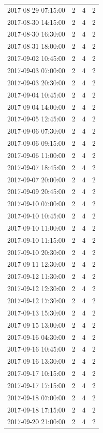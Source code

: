 \begin{tabular}{lrrr}
2017-08-29 07:15:00 & 2 & 4 & 2 \\
2017-08-30 14:15:00 & 2 & 4 & 2 \\
2017-08-30 16:30:00 & 2 & 4 & 2 \\
2017-08-31 18:00:00 & 2 & 4 & 2 \\
2017-09-02 10:45:00 & 2 & 4 & 2 \\
2017-09-03 07:00:00 & 2 & 4 & 2 \\
2017-09-03 20:30:00 & 2 & 4 & 2 \\
2017-09-04 10:45:00 & 2 & 4 & 2 \\
2017-09-04 14:00:00 & 2 & 4 & 2 \\
2017-09-05 12:45:00 & 2 & 4 & 2 \\
2017-09-06 07:30:00 & 2 & 4 & 2 \\
2017-09-06 09:15:00 & 2 & 4 & 2 \\
2017-09-06 11:00:00 & 2 & 4 & 2 \\
2017-09-07 18:45:00 & 2 & 4 & 2 \\
2017-09-07 20:00:00 & 2 & 4 & 2 \\
2017-09-09 20:45:00 & 2 & 4 & 2 \\
2017-09-10 07:00:00 & 2 & 4 & 2 \\
2017-09-10 10:45:00 & 2 & 4 & 2 \\
2017-09-10 11:00:00 & 2 & 4 & 2 \\
2017-09-10 11:15:00 & 2 & 4 & 2 \\
2017-09-10 20:30:00 & 2 & 4 & 2 \\
2017-09-11 12:30:00 & 2 & 4 & 2 \\
2017-09-12 11:30:00 & 2 & 4 & 2 \\
2017-09-12 12:30:00 & 2 & 4 & 2 \\
2017-09-12 17:30:00 & 2 & 4 & 2 \\
2017-09-13 15:30:00 & 2 & 4 & 2 \\
2017-09-15 13:00:00 & 2 & 4 & 2 \\
2017-09-16 04:30:00 & 2 & 4 & 2 \\
2017-09-16 10:45:00 & 2 & 4 & 2 \\
2017-09-16 13:30:00 & 2 & 4 & 2 \\
2017-09-17 10:15:00 & 2 & 4 & 2 \\
2017-09-17 17:15:00 & 2 & 4 & 2 \\
2017-09-18 07:00:00 & 2 & 4 & 2 \\
2017-09-18 17:15:00 & 2 & 4 & 2 \\
2017-09-20 21:00:00 & 2 & 4 & 2 \\

\end{tabular}
